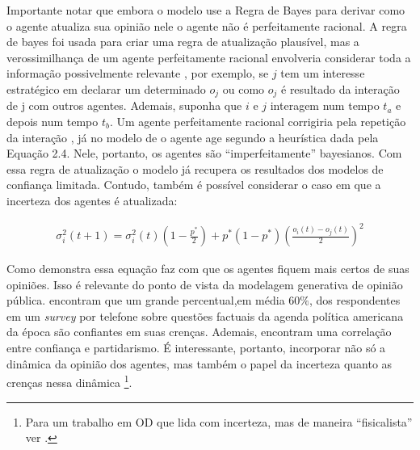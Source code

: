   Importante notar que embora o modelo use a Regra de Bayes para derivar como o
  agente atualiza sua opinião nele o agente não é perfeitamente racional. A
  regra de bayes foi usada para criar uma regra de atualização plausível, mas a
  verossimilhança de um agente perfeitamente racional envolveria considerar
  toda a informação possivelmente relevante
  , por exemplo, se \(j\) tem um interesse estratégico em declarar um
  determinado \(o_j\) ou como \(o_j\) é resultado da interação de j com outros
  agentes. Ademais, suponha que \(i\) e \(j\) interagem num tempo \(t_a\) e
  depois num tempo \(t_b\). Um agente perfeitamente racional corrigiria pela
  repetição da interação \cite{acemoglu2011opinion}, já no modelo de
   o agente age segundo a heurística dada pela
  Equação 2.4. Nele, portanto, os agentes são ``imperfeitamente'' bayesianos.
  Com essa regra de atualização o modelo já recupera os resultados dos modelos
  de confiança limitada. Contudo, também é possível considerar o caso em que a
  incerteza dos agentes é atualizada:

      \begin{align}
    \sigma_i^2(t+1)
    =
    \sigma_i^2(t)
    (1 - \frac{p^*}{2})
    +
    p^*
    (1-p^*)
    (\frac{o_i(t)-o_j(t)}{2})^2
      \end{align}

      Como demonstra  essa equação faz com que
      os agentes fiquem mais certos de suas opiniões. Isso é relevante do ponto
      de vista da modelagem generativa de opinião pública.
       encontram que um grande
      percentual,em média \( 60 \%\), dos respondentes em um
      \textit{survey} por telefone sobre questões factuais da agenda política
      americana da época são confiantes em suas crenças. Ademais, encontram uma
      correlação entre confiança e partidarismo. É interessante, portanto,
      incorporar não só a dinâmica da opinião dos agentes, mas também o papel da
      incerteza quanto as crenças nessa dinâmica \footnote{Para um trabalho em
        OD que lida com incerteza, mas de maneira ``fisicalista'' ver
        .}.


